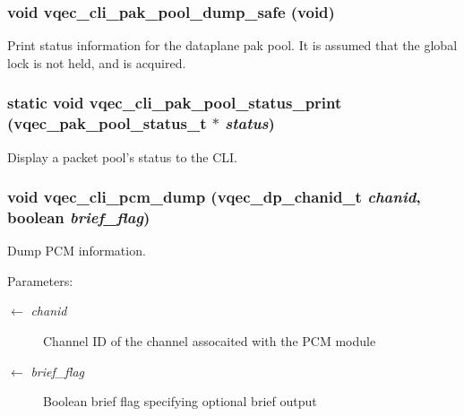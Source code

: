 \subsubsection{\setlength{\rightskip}{0pt plus 5cm}void vqec\_\-cli\_\-pak\_\-pool\_\-dump\_\-safe (void)}\label{vqec__cli__interface_8c_aa61e72da7a4578f372774dd56b0cdd2}


Print status information for the dataplane pak pool. It is assumed that the global lock is not held, and is acquired. 
\subsubsection{\setlength{\rightskip}{0pt plus 5cm}static void vqec\_\-cli\_\-pak\_\-pool\_\-status\_\-print (vqec\_\-pak\_\-pool\_\-status\_\-t $\ast$ {\em status})\hspace{0.3cm}{\tt  [static]}}\label{vqec__cli__interface_8c_10feec4f445662f1fd34bae60d4a52f0}


Display a packet pool's status to the CLI. 
\subsubsection{\setlength{\rightskip}{0pt plus 5cm}void vqec\_\-cli\_\-pcm\_\-dump (vqec\_\-dp\_\-chanid\_\-t {\em chanid}, boolean {\em brief\_\-flag})}\label{vqec__cli__interface_8c_6748be0200a306c1b2083a795b6e7a91}


Dump PCM information.

\begin{Desc}
\item[Parameters:]
\begin{description}
\item[\mbox{$\leftarrow$} {\em chanid}]Channel ID of the channel assocaited with the PCM module \item[\mbox{$\leftarrow$} {\em brief\_\-flag}]Boolean brief flag specifying optional brief output \end{description}
\end{Desc}

